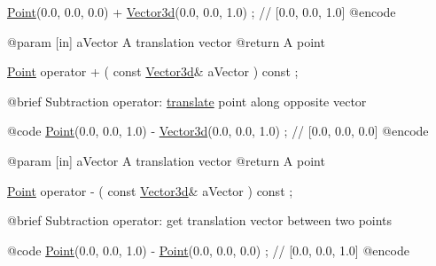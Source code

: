 \begin{DoxyCode}
                        \hyperlink{classlibrary_1_1math_1_1geom_1_1d3_1_1objects_1_1_point_a617e690ab6091af3de729cee337e309e}{Point}(0.0, 0.0, 0.0) + \hyperlink{namespacelibrary_1_1math_1_1obj_a977e84e9bf317a4e7dd9d6d671d6da2f}{Vector3d}(0.0, 0.0, 1.0) ; \textcolor{comment}{// [0.0, 0.0, 1.0]}
    @encode
   
    @param              [in] aVector A translation vector
    @\textcolor{keywordflow}{return}             A point

\hyperlink{classlibrary_1_1math_1_1geom_1_1d3_1_1objects_1_1_point_a617e690ab6091af3de729cee337e309e}{Point}                   operator +                                  (   \textcolor{keyword}{const}   
      \hyperlink{namespacelibrary_1_1math_1_1obj_a977e84e9bf317a4e7dd9d6d671d6da2f}{Vector3d}&                   aVector                                     ) \textcolor{keyword}{const} ;

    @brief              Subtraction \textcolor{keyword}{operator}: \hyperlink{classlibrary_1_1math_1_1geom_1_1d3_1_1objects_1_1_point_a7525be2cff259addc949a3aa05a715c7}{translate} point along opposite vector
   
    @code
                        \hyperlink{classlibrary_1_1math_1_1geom_1_1d3_1_1objects_1_1_point_a617e690ab6091af3de729cee337e309e}{Point}(0.0, 0.0, 1.0) - \hyperlink{namespacelibrary_1_1math_1_1obj_a977e84e9bf317a4e7dd9d6d671d6da2f}{Vector3d}(0.0, 0.0, 1.0) ; \textcolor{comment}{// [0.0, 0.0, 0.0]}
    @encode
   
    @param              [in] aVector A translation vector
    @\textcolor{keywordflow}{return}             A point

\hyperlink{classlibrary_1_1math_1_1geom_1_1d3_1_1objects_1_1_point_a617e690ab6091af3de729cee337e309e}{Point}                   operator -                                  (   \textcolor{keyword}{const}   
      \hyperlink{namespacelibrary_1_1math_1_1obj_a977e84e9bf317a4e7dd9d6d671d6da2f}{Vector3d}&                   aVector                                     ) \textcolor{keyword}{const} ;

    @brief              Subtraction \textcolor{keyword}{operator}: \textcolor{keyword}{get} translation vector between two points
   
    @code
                        \hyperlink{classlibrary_1_1math_1_1geom_1_1d3_1_1objects_1_1_point_a617e690ab6091af3de729cee337e309e}{Point}(0.0, 0.0, 1.0) - \hyperlink{classlibrary_1_1math_1_1geom_1_1d3_1_1objects_1_1_point_a617e690ab6091af3de729cee337e309e}{Point}(0.0, 0.0, 0.0)  ; \textcolor{comment}{// [0.0, 0.0, 1.0]}
    @encode
   

\end{DoxyCode}
